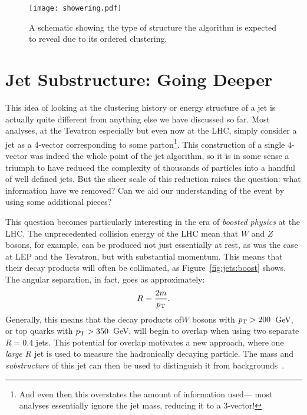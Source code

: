 
\begin{figure}
\centering
\texttt{[image: showering.pdf]}
\label{fig:jets:showering}
\caption{A schematic showing the type of structure the \kt algorithm is expected to reveal due to its \pt ordered clustering.}
\end{figure}



\section{Jet Substructure: Going Deeper}

This idea of looking at the clustering history or energy structure  of a jet is actually quite different from anything else we have discussed so far. Most analyses, at the Tevatron especially but even now at the LHC, simply consider a jet as a 4-vector corresponding to some parton\footnote{And even then this overstates the amount of information used--- most analyses essentially ignore the jet mass, reducing it to a 3-vector!}. This construction of a single 4-vector was indeed the whole point of the jet algorithm, so it is in some sense a triumph to have reduced the complexity of thousands of particles into a handful of well defined jets. But the sheer scale of this reduction raises the question: what information have we removed? Can we aid our understanding of the event by using some additional pieces?

This question becomes particularly interesting in the era of \textit{boosted physics} at the LHC. The unprecedented collision energy of the LHC mean that $W$ and $Z$ bosons, for example, can be produced not just essentially at rest, as was the case at LEP and the Tevatron, but with substantial momentum. This means that their decay products will often be collimated, as Figure~\ref{fig:jets:boost} shows. The angular separation, in fact, goes as approximately:
%
\begin{equation}
R = \frac{2 m}{p_{\text{T}}}.
\end{equation}
%
Generally, this means that the decay products of$W$ bosons with $p_{\text{T}} > 200$~GeV, or top quarks with $p_{\text{T}} > 350$~GeV, will begin to overlap when using two separate $R=0.4$ jets. This potential for overlap motivates a new approach, where one \textit{large $R$} jet is used to measure the hadronically decaying particle. The mass and \textit{substructure} of this jet can then be used to distinguish it from backgrounds~\cite{Jetography}.

